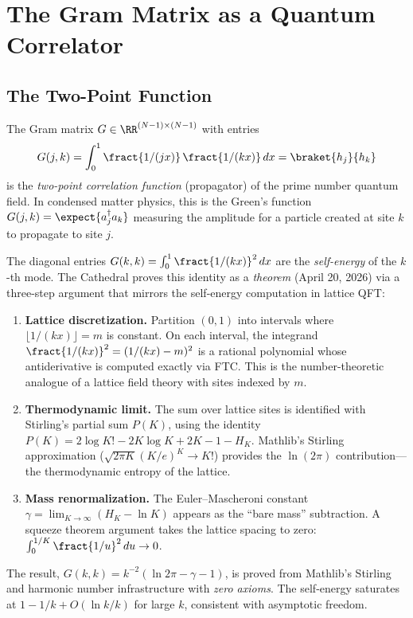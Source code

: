 \section{The Gram Matrix as a Quantum Correlator}

\subsection{The Two-Point Function}

The Gram matrix $G \in \RR^{(N-1) \times (N-1)}$ with entries
\[
  G(j,k) = \int_0^1 \fract{1/(jx)}\,\fract{1/(kx)}\,dx
  = \braket{h_j}{h_k}
\]
is the \emph{two-point correlation function} (propagator) of the
prime number quantum field. In condensed matter physics, this is the
Green's function $G(j,k) = \expect{a_j^\dagger a_k}$ measuring the
amplitude for a particle created at site $k$ to propagate to site $j$.

\begin{observation}[Diagonal = Self-Energy (Proved)]
The diagonal entries $G(k,k) = \int_0^1 \fract{1/(kx)}^2\,dx$ are
the \emph{self-energy} of the $k$-th mode. The Cathedral proves
this identity as a \emph{theorem} (April 20, 2026) via a three-step
argument that mirrors the self-energy computation in lattice QFT:
\begin{enumerate}
  \item \textbf{Lattice discretization.} Partition $(0,1)$ into intervals
    where $\lfloor 1/(kx) \rfloor = m$ is constant. On each interval,
    the integrand $\fract{1/(kx)}^2 = (1/(kx) - m)^2$ is a rational
    polynomial whose antiderivative is computed exactly via FTC.
    This is the number-theoretic analogue of a lattice field theory
    with sites indexed by $m$.
  \item \textbf{Thermodynamic limit.} The sum over lattice sites is
    identified with Stirling's partial sum $P(K)$, using the identity
    $P(K) = 2\log K! - 2K\log K + 2K - 1 - H_K$.
    Mathlib's Stirling approximation ($\sqrt{2\pi K}(K/e)^K \to K!$)
    provides the $\ln(2\pi)$ contribution---the thermodynamic
    entropy of the lattice.
  \item \textbf{Mass renormalization.} The Euler--Mascheroni constant
    $\gamma = \lim_{K\to\infty}(H_K - \ln K)$ appears as the ``bare
    mass'' subtraction. A squeeze theorem argument takes the lattice
    spacing to zero: $\int_0^{1/K} \fract{1/u}^2\,du \to 0$.
\end{enumerate}
The result, $G(k,k) = k^{-2}(\ln 2\pi - \gamma - 1)$, is proved from
Mathlib's Stirling and harmonic number infrastructure with \emph{zero
axioms}. The self-energy saturates at $1 - 1/k + O(\ln k / k)$ for
large $k$, consistent with asymptotic freedom.
\end{observation}

